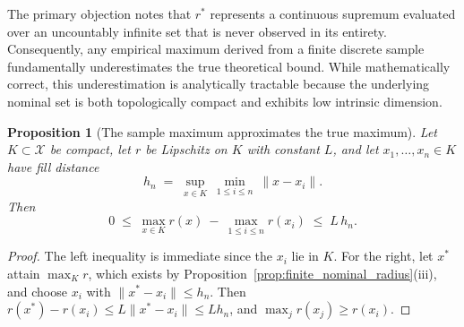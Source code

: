 \documentclass[a4paper]{cas-sc}
\newtheorem{proposition}{Proposition}
\newcommand{\X}{\ensuremath{\mathcal{X}}}
\newcommand{\residual}{\ensuremath{r}}
\begin{document}
The primary objection notes that \(\residual^{*}\) represents a continuous supremum evaluated over an uncountably infinite set that is never observed in its entirety. Consequently, any empirical maximum derived from a finite discrete sample fundamentally underestimates the true theoretical bound. While mathematically correct, this underestimation is analytically tractable because the underlying nominal set is both topologically compact and exhibits low intrinsic dimension.

\begin{proposition}[The sample maximum approximates the true maximum]
\label{prop:fill_distance}
Let \(K\subset\X\) be compact, let \(\residual\) be Lipschitz on \(K\) with
constant \(L\), and let \(x_1,\ldots,x_n\in K\) have fill distance
\begin{equation}
h_n \;=\; \sup_{x\in K}\ \min_{1\le i\le n}\ \lVert x-x_i\rVert .
\label{eq:fill_distance}
\end{equation}
Then
\begin{equation}
0 \;\le\; \max_{x\in K}\residual(x)\ -\ \max_{1\le i\le n}\residual(x_i)
  \;\le\; L\,h_n .
\label{eq:fill_bound}
\end{equation}
\end{proposition}

\begin{proof}
The left inequality is immediate since the \(x_i\) lie in \(K\). For the
right, let \(x^{*}\) attain \(\max_K\residual\), which exists by
Proposition~\ref{prop:finite_nominal_radius}(iii), and choose \(x_i\) with
\(\lVert x^{*}-x_i\rVert\le h_n\). Then
\(\residual(x^{*})-\residual(x_i)\le L\lVert x^{*}-x_i\rVert\le L h_n\), and
\(\max_j\residual(x_j)\ge\residual(x_i)\).
\end{proof}
\end{document}
